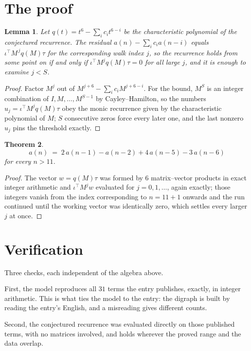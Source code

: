 \documentclass[11pt,a4paper]{article}
\theoremstyle{plain}
\newtheorem{theorem}{Theorem}
\newtheorem{lemma}[theorem]{Lemma}
\theoremstyle{definition}
\begin{document}
\section{The proof}

\begin{lemma}\label{lem:crit}
Let $q(t)=t^{6}-\sum_i c_it^{6-i}$ be the characteristic polynomial of the
conjectured recurrence. The residual $a(n)-\sum_ic_ia(n-i)$ equals
$\iota^{\!\top}M^{\,j}q(M)\tau$ for the corresponding walk index $j$, so the recurrence
holds from some point on if and only if $\iota^{\!\top}M^{j}q(M)\tau=0$ for all large $j$,
and it is enough to examine $j<S$.
\end{lemma}

\begin{proof}
Factor $M^{j}$ out of $M^{j+6}-\sum_ic_iM^{j+6-i}$. For the bound, $M^{S}$
is an integer combination of $I,M,\dots,M^{S-1}$ by Cayley--Hamilton, so the numbers
$u_j=\iota^{\!\top}M^{j}q(M)\tau$ obey the monic recurrence given by the characteristic
polynomial of $M$; $S$ consecutive zeros force every later one, and the last nonzero $u_j$
pins the threshold exactly.
\end{proof}

\begin{theorem}
\[
a(n)\;=\;2\,a(n-1) - a(n-2) + 4\,a(n-5) - 3\,a(n-6)
\]
for every $n>11$.
\end{theorem}

\begin{proof}
The vector $w=q(M)\tau$ was formed by $6$ matrix--vector products in exact integer
arithmetic and $\iota^{\!\top}M^{j}w$ evaluated for $j=0,1,\dots$, again exactly; those
integers vanish from the index corresponding to $n=11+1$ onwards and the run continued
until the working vector was identically zero, which settles every larger $j$ at once.
\end{proof}

\section{Verification}

Three checks, each independent of the algebra above.

First, the model reproduces all $31$ terms the entry publishes, exactly, in integer
arithmetic. This is what ties the model to the entry: the digraph is built by reading the
entry's English, and a misreading gives different counts.

Second, the conjectured recurrence was evaluated directly on those published terms, with no
matrices involved, and holds wherever the proved range and the data overlap.
\end{document}
